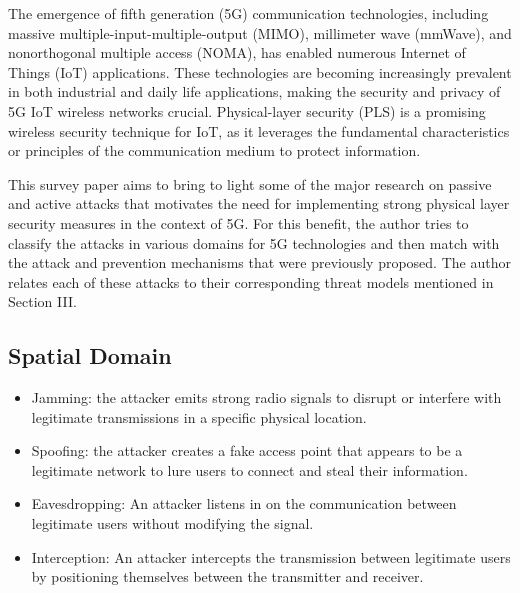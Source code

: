 \documentclass[conference]{IEEEtran}
\begin{document}
The emergence of fifth generation (5G) communication technologies, including massive multiple-input-multiple-output (MIMO), millimeter wave (mmWave), and nonorthogonal multiple access (NOMA), has enabled numerous Internet of Things (IoT) applications. These technologies are becoming increasingly prevalent in both industrial and daily life applications, making the security and privacy of 5G IoT wireless networks crucial. Physical-layer security (PLS) is a promising wireless security technique for IoT, as it leverages the fundamental characteristics or principles of the communication medium to protect information.

This survey paper aims to bring to light some of the major research on passive and active attacks that motivates the need for implementing strong physical layer security measures in the context of 5G. For this benefit, the author tries to classify the attacks in various domains for 5G technologies and then match with the attack and prevention mechanisms that were previously proposed. The author relates each of these attacks to their corresponding threat models mentioned in Section III.
\subsection{Spatial Domain}

\begin{itemize}
    \item Jamming: the attacker emits strong radio signals to disrupt or interfere with legitimate transmissions in a specific physical location.
    \item Spoofing: the attacker creates a fake access point that appears to be a legitimate network to lure users to connect and steal their information.
    \item Eavesdropping: An attacker listens in on the communication between legitimate users without modifying the signal.
    \item Interception: An attacker intercepts the transmission between legitimate users by positioning themselves between the transmitter and receiver.

\end{itemize}
\end{document}
